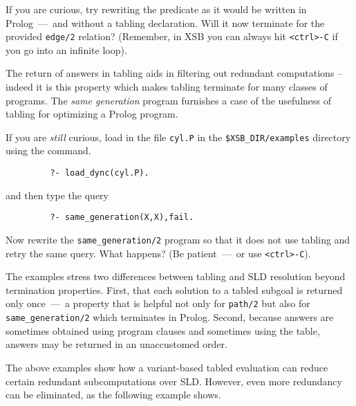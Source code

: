 \begin{exercise}
If you are curious, try rewriting the  predicate as it
would be written in Prolog~---~and without a tabling declaration.
Will it now terminate for the provided {\tt edge/2} relation?
(Remember, in XSB you can always hit \verb|<ctrl>-C| if you go into an
infinite loop).\fillBox
\end{exercise}

The return of answers in tabling aids in filtering out redundant
computations -- indeed it is this property which makes tabling
terminate for many classes of programs.  The {\em same generation}
program furnishes a case of the usefulness of tabling for optimizing a
Prolog program.

\begin{exercise} \label{ex:samegen}
If you are {\em still} curious, load in the file {\tt cyl.P} in the
\verb|$XSB_DIR/examples| directory using the command.
\begin{verbatim}
         ?- load_dync(cyl.P).
\end{verbatim}
and then type the query
\begin{verbatim}
         ?- same_generation(X,X),fail.
\end{verbatim}
Now rewrite the {\tt same\_generation/2} program so that it does not
use tabling and retry the same query.  What happens?  (Be
patient~---~or use \verb|<ctrl>-C|).\fillBox
\end{exercise}

The examples stress two differences between tabling and SLD resolution
beyond termination properties.  First, that each solution to a tabled
subgoal is returned only once~---~a property that is helpful not only
for {\tt path/2} but also for {\tt same\_generation/2} which
terminates in Prolog.  Second, because answers are sometimes obtained
using program clauses and sometimes using the table, answers may be
returned in an unaccustomed order.

The above examples show how a variant-based tabled evaluation can
reduce certain redundant subcomputations over SLD\@.  However, even
more redundancy can be eliminated, as the following example shows.


